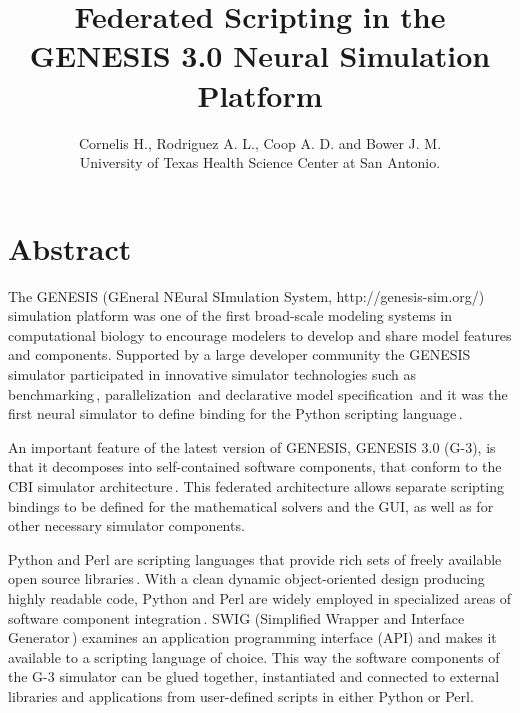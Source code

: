 \documentclass[12pt]{article}
\begin{document}
\title{\bf Federated Scripting in the GENESIS 3.0 Neural Simulation
  Platform}

\author{Cornelis H., Rodriguez A. L., Coop A. D. and Bower J. M. \\
  {\small University of Texas Health Science Center at San Antonio.}
}

\maketitle
{}
\newpage
\section*{Abstract}
The GENESIS (GEneral NEural SImulation System,
http://genesis-sim.org/) simulation platform was one of the first
broad-scale modeling systems in computational biology to encourage
modelers to develop and share model features and components.
Supported by a large developer community the GENESIS simulator
participated in innovative simulator technologies such as
benchmarking\,\cite{bhalla92:_rallp},
parallelization\,\cite{goddard98:_book_genes} and declarative model
specification\,\cite{nigel01:_towar_neurom} and it was the first
neural simulator to define binding for the Python scripting
language\,\cite{vanier97:_genes_python}.

An important feature of the latest version of GENESIS, GENESIS 3.0 (G-3), is
that it decomposes into self-contained software components, that
conform to the CBI simulator
architecture\,\cite{cornelis08:_cbi_archit_comput_simul_realis}.  This
federated architecture allows separate scripting bindings to be
defined for the mathematical solvers and the GUI, as well as for other
necessary simulator components.

Python and Perl are scripting languages that provide rich sets of
freely available open source
libraries\,\cite{langtangen04:_python_scrip_comput_scien,valiente09:_combin_patter_match_algor_comput}.
With a clean dynamic object-oriented design producing highly readable
code, Python and Perl are widely employed in specialized areas of
software component
integration\,\cite{thiruvathukal01:_web_progr_python,
  lee07:_open_sourc_devel_lamp}.
SWIG (Simplified Wrapper and Interface
Generator\,\cite{08:_simpl_wrapp_inter_gener}) examines an application
programming interface (API) and makes it available to a scripting
language of choice.  This way the software components of the G-3
simulator can be glued together, instantiated and connected to
external libraries and applications from user-defined scripts in
either Python or Perl.
\end{document}
